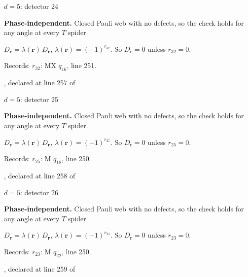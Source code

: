 \label{d5_det024}
{\Large $d=5$: detector 24}\par
\textbf{Phase-independent.} Closed Pauli web with no defects, so the check holds for any angle at every $T$ spider.
\begin{center}
\end{center}
\vspace{-1mm}
$D_{\boldsymbol r}=\lambda(\boldsymbol r)\,D_{\boldsymbol r}$, \quad $\lambda(\boldsymbol r)=(-1)^{r_{32}}$. \qquad So $D_{\boldsymbol r}=0$ unless $r_{32}=0$.
\par\smallskip\begin{minipage}{.98\linewidth}\small Records: $r_{32}$: MX $q_{16}$, line 251.\end{minipage}
\vfill
{\footnotesize\texttt{}, declared at line 257 of \texttt{}}
\newpage

\label{d5_det025}
{\Large $d=5$: detector 25}\par
\textbf{Phase-independent.} Closed Pauli web with no defects, so the check holds for any angle at every $T$ spider.
\begin{center}
\end{center}
\vspace{-1mm}
$D_{\boldsymbol r}=\lambda(\boldsymbol r)\,D_{\boldsymbol r}$, \quad $\lambda(\boldsymbol r)=(-1)^{r_{25}}$. \qquad So $D_{\boldsymbol r}=0$ unless $r_{25}=0$.
\par\smallskip\begin{minipage}{.98\linewidth}\small Records: $r_{25}$: M $q_{18}$, line 250.\end{minipage}
\vfill
{\footnotesize\texttt{}, declared at line 258 of \texttt{}}
\newpage

\label{d5_det026}
{\Large $d=5$: detector 26}\par
\textbf{Phase-independent.} Closed Pauli web with no defects, so the check holds for any angle at every $T$ spider.
\begin{center}
\end{center}
\vspace{-1mm}
$D_{\boldsymbol r}=\lambda(\boldsymbol r)\,D_{\boldsymbol r}$, \quad $\lambda(\boldsymbol r)=(-1)^{r_{23}}$. \qquad So $D_{\boldsymbol r}=0$ unless $r_{23}=0$.
\par\smallskip\begin{minipage}{.98\linewidth}\small Records: $r_{23}$: M $q_{22}$, line 250.\end{minipage}
\vfill
{\footnotesize\texttt{}, declared at line 259 of \texttt{}}
\newpage

